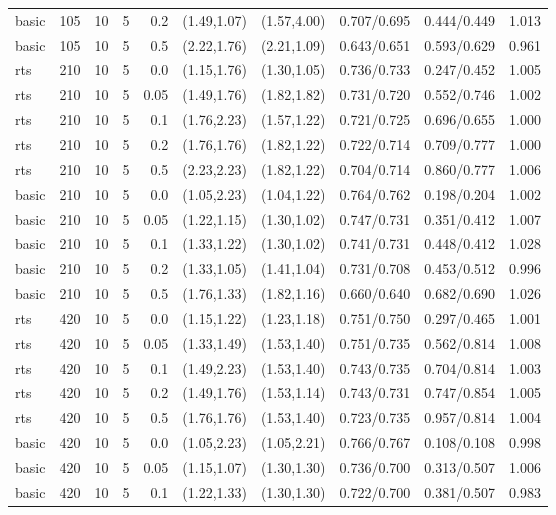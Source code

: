 \begin{tabular}{llrrrccccc}
basic & 105 & 10 & 5 & 0.2 & (1.49,1.07) & (1.57,4.00) & 0.707/0.695 & 0.444/0.449 & 1.013 \\
basic & 105 & 10 & 5 & 0.5 & (2.22,1.76) & (2.21,1.09) & 0.643/0.651 & 0.593/0.629 & 0.961 \\
rts & 210 & 10 & 5 & 0.0 & (1.15,1.76) & (1.30,1.05) & 0.736/0.733 & 0.247/0.452 & 1.005 \\
rts & 210 & 10 & 5 & 0.05 & (1.49,1.76) & (1.82,1.82) & 0.731/0.720 & 0.552/0.746 & 1.002 \\
rts & 210 & 10 & 5 & 0.1 & (1.76,2.23) & (1.57,1.22) & 0.721/0.725 & 0.696/0.655 & 1.000 \\
rts & 210 & 10 & 5 & 0.2 & (1.76,1.76) & (1.82,1.22) & 0.722/0.714 & 0.709/0.777 & 1.000 \\
rts & 210 & 10 & 5 & 0.5 & (2.23,2.23) & (1.82,1.22) & 0.704/0.714 & 0.860/0.777 & 1.006 \\
basic & 210 & 10 & 5 & 0.0 & (1.05,2.23) & (1.04,1.22) & 0.764/0.762 & 0.198/0.204 & 1.002 \\
basic & 210 & 10 & 5 & 0.05 & (1.22,1.15) & (1.30,1.02) & 0.747/0.731 & 0.351/0.412 & 1.007 \\
basic & 210 & 10 & 5 & 0.1 & (1.33,1.22) & (1.30,1.02) & 0.741/0.731 & 0.448/0.412 & 1.028 \\
basic & 210 & 10 & 5 & 0.2 & (1.33,1.05) & (1.41,1.04) & 0.731/0.708 & 0.453/0.512 & 0.996 \\
basic & 210 & 10 & 5 & 0.5 & (1.76,1.33) & (1.82,1.16) & 0.660/0.640 & 0.682/0.690 & 1.026 \\
rts & 420 & 10 & 5 & 0.0 & (1.15,1.22) & (1.23,1.18) & 0.751/0.750 & 0.297/0.465 & 1.001 \\
rts & 420 & 10 & 5 & 0.05 & (1.33,1.49) & (1.53,1.40) & 0.751/0.735 & 0.562/0.814 & 1.008 \\
rts & 420 & 10 & 5 & 0.1 & (1.49,2.23) & (1.53,1.40) & 0.743/0.735 & 0.704/0.814 & 1.003 \\
rts & 420 & 10 & 5 & 0.2 & (1.49,1.76) & (1.53,1.14) & 0.743/0.731 & 0.747/0.854 & 1.005 \\
rts & 420 & 10 & 5 & 0.5 & (1.76,1.76) & (1.53,1.40) & 0.723/0.735 & 0.957/0.814 & 1.004 \\
basic & 420 & 10 & 5 & 0.0 & (1.05,2.23) & (1.05,2.21) & 0.766/0.767 & 0.108/0.108 & 0.998 \\
basic & 420 & 10 & 5 & 0.05 & (1.15,1.07) & (1.30,1.30) & 0.736/0.700 & 0.313/0.507 & 1.006 \\
basic & 420 & 10 & 5 & 0.1 & (1.22,1.33) & (1.30,1.30) & 0.722/0.700 & 0.381/0.507 & 0.983 \\

\end{tabular}
